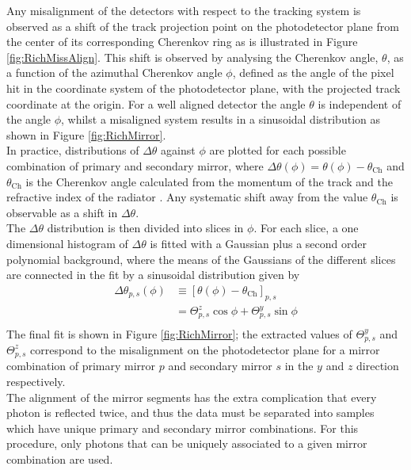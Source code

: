 Any misalignment of the \rich detectors with respect to the tracking system is observed as a shift of the track projection point on the photodetector plane from the center of its corresponding Cherenkov ring as is illustrated in Figure \ref{fig:RichMissAlign}. This shift is observed by analysing the Cherenkov angle, $\theta$, as a function of the azimuthal Cherenkov angle $\phi$, defined as the angle of the pixel hit in the coordinate system of the photodetector plane, with the projected track coordinate at the origin. For a well aligned detector the angle $\theta$ is independent of the angle $\phi$, whilst a misaligned system results in a sinusoidal distribution as shown in Figure \ref{fig:RichMirror}.\\
In practice, distributions of $\Delta \theta$ against $\phi$ are plotted for each possible combination of primary and secondary mirror, where $\Delta \theta (\phi) = \theta(\phi) - \theta_{\mathrm{Ch}}$ and $\theta_{\mathrm{Ch}}$ is the Cherenkov angle calculated from the momentum of the track and the refractive index of the radiator \cite{LHCb-DP-2012-003}. Any systematic shift away from the value $\theta_{\mathrm{Ch}}$ is observable as a shift in $\Delta \theta$. \\
The $\Delta \theta$ distribution is then divided into slices in $\phi$. For each slice, a one dimensional histogram of $\Delta \theta$ is fitted with a Gaussian plus a second order polynomial background, where the means of the Gaussians of the different slices are connected in the fit by a sinusoidal distribution given by 
\begin{equation}
\begin{aligned}
 \Delta \theta_{p,s} (\phi) & \equiv   [\theta(\phi)-\theta_{\mathrm{Ch}} ]_{p,s} \\
                            &    =         \varTheta^z_{p,s}\cos\phi
                                 +         \varTheta^y_{p,s}\sin\phi                 \\
\end{aligned}
\end{equation}
The final fit is shown in Figure \ref{fig:RichMirror}; the extracted values of $\varTheta^y_{p,s}$ and $\varTheta^z_{p,s}$ correspond to the misalignment on the  photodetector plane for a mirror combination of primary mirror $p$ and secondary mirror $s$ in the $y$ and $z$ direction respectively.\\
The alignment of the mirror segments has the extra complication that every photon is reflected twice, and thus the data must be separated into samples which have unique primary and secondary mirror combinations. For this procedure, only photons that can be uniquely associated to a given mirror combination are used. \\
